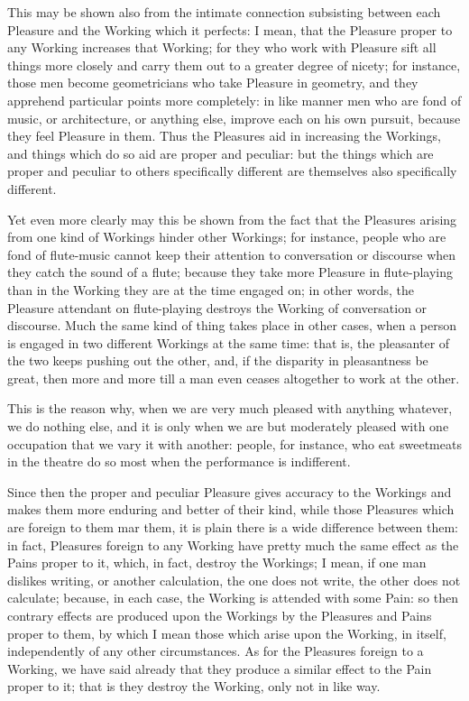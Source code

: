 This may be shown also from the intimate connection subsisting between
each Pleasure and the Working which it perfects: I mean, that the
Pleasure proper to any Working increases that Working; for they who
work with Pleasure sift all things more closely and carry them out to a
greater degree of nicety; for instance, those men become geometricians
who take Pleasure in geometry, and they apprehend particular points more
completely: in like manner men who are fond of music, or architecture,
or anything else, improve each on his own pursuit, because they feel
Pleasure in them. Thus the Pleasures aid in increasing the Workings, and
things which do so aid are proper and peculiar: but the things which are
proper and peculiar to others specifically different are themselves also
specifically different.

Yet even more clearly may this be shown from the fact that the Pleasures
arising from one kind of Workings hinder other Workings; for instance,
people who are fond of flute-music cannot keep their attention to
conversation or discourse when they catch the sound of a flute; because
they take more Pleasure in flute-playing than in the Working they are
at the time engaged on; in other words, the Pleasure attendant on
flute-playing destroys the Working of conversation or discourse. Much
the same kind of thing takes place in other cases, when a person is
engaged in two different Workings at the same time: that is, the
pleasanter of the two keeps pushing out the other, and, if the disparity
in pleasantness be great, then more and more till a man even ceases
altogether to work at the other.

This is the reason why, when we are very much pleased with anything
whatever, we do nothing else, and it is only when we are but moderately
pleased with one occupation that we vary it with another: people,
for instance, who eat sweetmeats in the theatre do so most when the
performance is indifferent.

Since then the proper and peculiar Pleasure gives accuracy to the
Workings and makes them more enduring and better of their kind, while
those Pleasures which are foreign to them mar them, it is plain there
is a wide difference between them: in fact, Pleasures foreign to any
Working have pretty much the same effect as the Pains proper to it,
which, in fact, destroy the Workings; I mean, if one man dislikes
writing, or another calculation, the one does not write, the other does
not calculate; because, in each case, the Working is attended with some
Pain: so then contrary effects are produced upon the Workings by the
Pleasures and Pains proper to them, by which I mean those which arise
upon the Working, in itself, independently of any other circumstances.
As for the Pleasures foreign to a Working, we have said already that
they produce a similar effect to the Pain proper to it; that is they
destroy the Working, only not in like way.

